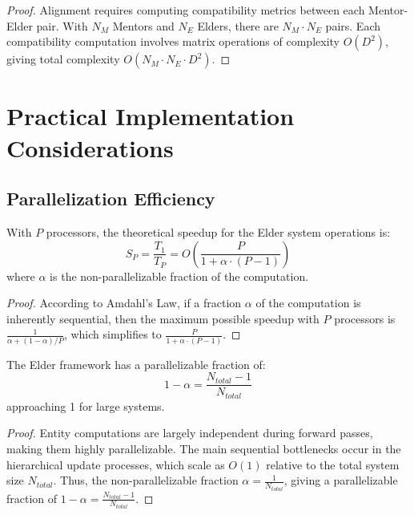 \begin{proof}
Alignment requires computing compatibility metrics between each Mentor-Elder pair. With $N_M$ Mentors and $N_E$ Elders, there are $N_M \cdot N_E$ pairs. Each compatibility computation involves matrix operations of complexity $O(D^2)$, giving total complexity $O(N_M \cdot N_E \cdot D^2)$.
\end{proof}

\section{Practical Implementation Considerations}

\subsection{Parallelization Efficiency}

\begin{theorem}
With $P$ processors, the theoretical speedup for the Elder system operations is:
\begin{equation}
S_P = \frac{T_1}{T_P} = O\left(\frac{P}{1 + \alpha \cdot (P-1)}\right)
\end{equation}
where $\alpha$ is the non-parallelizable fraction of the computation.
\end{theorem}

\begin{proof}
According to Amdahl's Law, if a fraction $\alpha$ of the computation is inherently sequential, then the maximum possible speedup with $P$ processors is $\frac{1}{\alpha + (1-\alpha)/P}$, which simplifies to $\frac{P}{1 + \alpha \cdot (P-1)}$.
\end{proof}

\begin{theorem}
The Elder framework has a parallelizable fraction of:
\begin{equation}
1 - \alpha = \frac{N_{total} - 1}{N_{total}}
\end{equation}
approaching 1 for large systems.
\end{theorem}

\begin{proof}
Entity computations are largely independent during forward passes, making them highly parallelizable. The main sequential bottlenecks occur in the hierarchical update processes, which scale as $O(1)$ relative to the total system size $N_{total}$. Thus, the non-parallelizable fraction $\alpha = \frac{1}{N_{total}}$, giving a parallelizable fraction of $1 - \alpha = \frac{N_{total} - 1}{N_{total}}$.
\end{proof}

